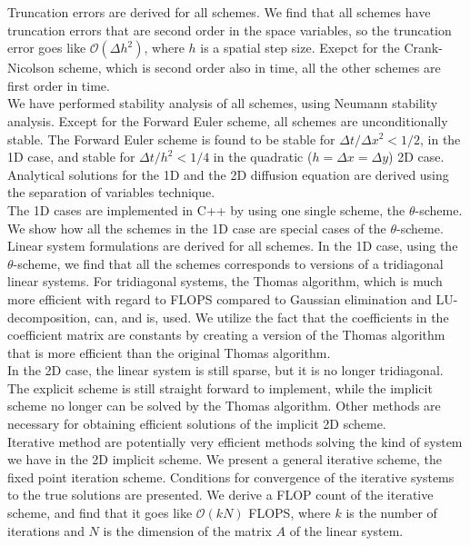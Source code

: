 \documentclass{article}
\begin{document}
Truncation errors are derived for all schemes. We find that all schemes have truncation errors that are second order in the space variables, so the truncation error goes like $\mathcal{O}(\Delta h^2)$, where $h$ is a spatial step size. Exepct for the Crank-Nicolson scheme, which is second order also in time, all the other schemes are first order in time.\\

We have performed stability analysis of all schemes, using Neumann stability analysis. Except for the Forward Euler scheme, all schemes are unconditionally stable. The Forward Euler scheme is found to be stable for $\Delta t/\Delta x^2 < 1/2$, in the 1D case, and stable for $\Delta t /h^2 < 1/4$ in the quadratic ($h = \Delta x = \Delta y$) 2D case.\\

Analytical solutions for the 1D and the 2D diffusion equation are derived using the separation of variables technique. \\

The 1D cases are implemented in C++ by using one single scheme, the $\theta$-scheme. We show how all the schemes in the 1D case are special cases of the $\theta$-scheme.\\

Linear system formulations are derived for all schemes. In the 1D case, using the $\theta$-scheme, we find that all the schemes corresponds to versions of a tridiagonal linear systems. For tridiagonal systems, the Thomas algorithm, which is much more efficient with regard to FLOPS compared to Gaussian elimination and LU-decomposition, can, and is, used. We utilize the fact that the coefficients in the coefficient matrix are constants by creating a version of the Thomas algorithm that is more efficient than the original Thomas algorithm. \\

In the 2D case, the linear system is still sparse, but it is no longer tridiagonal. The explicit scheme is still straight forward to implement, while the implicit scheme no longer can be solved by the Thomas algorithm. Other methods are necessary for obtaining efficient solutions of the implicit 2D scheme.\\ 

Iterative method are potentially very efficient methods solving the kind of system we have in the 2D implicit scheme. We present a general iterative scheme, the fixed point iteration scheme. Conditions for convergence of the iterative systems to the true solutions are presented. We derive a FLOP count of the iterative scheme, and find that it goes like $\mathcal{O}(k N)$ FLOPS, where $k$ is the number of iterations and $N$ is the dimension of the matrix $A$ of the linear system. \\
\end{document}
